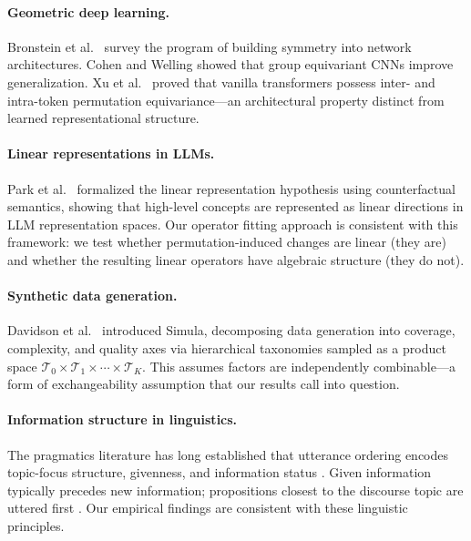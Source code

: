 \documentclass[10pt, letterpaper]{article}
\begin{document}
\paragraph{Geometric deep learning.} Bronstein et al.\ \cite{bronstein2021geometric} survey the program of building symmetry into network architectures. Cohen and Welling \cite{cohen2016group} showed that group equivariant CNNs improve generalization. Xu et al.\ \cite{xu2024permutation} proved that vanilla transformers possess inter- and intra-token permutation equivariance---an architectural property distinct from learned representational structure.

\paragraph{Linear representations in LLMs.} Park et al.\ \cite{park2024linear} formalized the linear representation hypothesis using counterfactual semantics, showing that high-level concepts are represented as linear directions in LLM representation spaces. Our operator fitting approach is consistent with this framework: we test whether permutation-induced changes are linear (they are) and whether the resulting linear operators have algebraic structure (they do not).

\paragraph{Synthetic data generation.} Davidson et al.\ \cite{davidson2026simula} introduced Simula, decomposing data generation into coverage, complexity, and quality axes via hierarchical taxonomies sampled as a product space $\mathcal{T}_0 \times \mathcal{T}_1 \times \cdots \times \mathcal{T}_K$. This assumes factors are independently combinable---a form of exchangeability assumption that our results call into question.

\paragraph{Information structure in linguistics.} The pragmatics literature has long established that utterance ordering encodes topic-focus structure, givenness, and information status \cite{krifka2008, lambrecht1994}. Given information typically precedes new information; propositions closest to the discourse topic are uttered first \cite{vandijk1977}. Our empirical findings are consistent with these linguistic principles.

\end{document}
